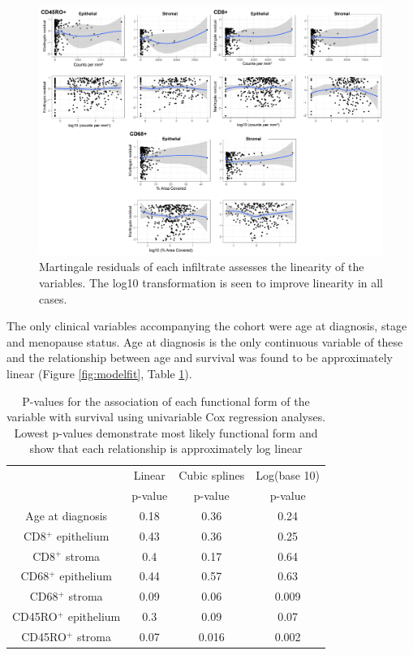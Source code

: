 \begin{figure}
    \centering
    \includegraphics{Chapter2/Figs/Raster/martingale_plots.png}
    \caption{Martingale residuals of each infiltrate assesses the linearity of the variables. The log10 transformation is seen to improve linearity in all cases.}
    \label{fig:martingale}
\end{figure}

The only clinical variables accompanying the cohort were age at diagnosis, stage and menopause status. Age at diagnosis is the only continuous variable of these and the relationship between age and survival was found to be approximately linear (Figure \ref{fig:modelfit}, Table \ref{tab:model_fit}). 

\begin{table}[]
    \centering
    \begin{tabular}{cccc} \hline
        	&	Linear 	&	Cubic splines	&	Log(base 10)	\\
	&	p-value	&	p-value	&	p-value	\\ \hline
Age at diagnosis	&	0.18	&	0.36	&	0.24	\\
CD8$^+$ epithelium	&	0.43	&	0.36	&	0.25	\\
CD8$^+$ stroma	&	0.4	&	0.17	&	0.64	\\
CD68$^+$ epithelium	&	0.44	&	0.57	&	0.63	\\
CD68$^+$ stroma	&	0.09	&	0.06	&	0.009	\\
CD45RO$^+$ epithelium	&	0.3	&	0.09	&	0.07	\\
CD45RO$^+$ stroma	&	0.07	&	0.016	&	0.002	\\
\hline

    \end{tabular}
    \caption[P-values for the association of each functional form of the variable with survival]{P-values for the association of each functional form of the variable with survival using univariable Cox regression analyses. Lowest p-values demonstrate most likely functional form and show that each relationship is approximately log linear}
    \label{tab:model_fit}
\end{table}

